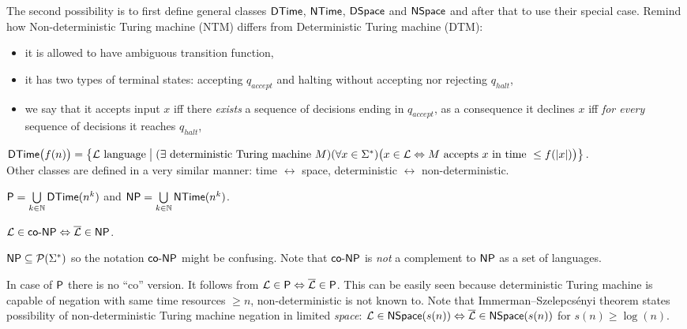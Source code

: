 		The second possibility is to first define general classes $\DTime$, $\NTime$, $\DSpace$ and $\NSpace$ and after that to use their special case. Remind how Non-deterministic Turing machine (NTM) differs from Deterministic Turing machine (DTM):
		\begin{itemize}
			\item it is allowed to have ambiguous transition function,
			\item it has two types of terminal states: accepting $q_{accept}$ and halting without accepting nor rejecting $q_{halt}$,
			\item we say that it accepts input $x$ iff there {\em exists} a sequence of decisions ending in $q_{accept}$, as a consequence it declines $x$ iff {\em for every} sequence of decisions it reaches $q_{halt}$,
		\end{itemize}
		
		\begin{defn}\label{def:DTime}
			$\DTime\bigl(f(n)\bigr) = \bigl\{ {\cal L}\textnormal{ language} \bigm| (\exists \textnormal{ deterministic Turing machine }M)\\ (\forall x\in\Sigma^*)\bigl(x\in{\cal L} \iff M\textnormal{ accepts }x\textnormal{ in time }\leq f(|x|)\bigr) \bigr\}$.\\
			Other classes are defined in a very similar manner: time $\leftrightarrow$ space, deterministic $\leftrightarrow$ non-deterministic.
		\end{defn}
		
		\begin{defn}
			$\P = \bigcup\limits_{k\in\N} \DTime(n^k)$ and $\NP = \bigcup\limits_{k\in\N} \NTime(n^k)$.
		\end{defn}
		
		\begin{defn}
			$ {\cal L} \in \coNP \iff {\cal\overline L} \in \NP $.
		\end{defn}
		
		\begin{note}
			$\NP\subseteq\powerset{\Sigma^*}$ so the notation $\coNP$ might be confusing. Note that $\coNP$ is {\em not} a complement to $\NP$ as a set of languages.
		\end{note}
		
		\begin{remark}
			In case of $\P$ there is no ``co'' version. It follows from ${\cal L} \in \P \iff \overline{\cal L} \in \P$. This can be easily seen because deterministic Turing machine is capable of negation with same time resources $\geq n$, non-deterministic is not known to. Note that Immerman--Szelepcsényi theorem states possibility of non-deterministic Turing machine negation in limited {\em space}: ${\cal L} \in \NSpace(s(n)) \iff \overline{\cal L} \in \NSpace(s(n))$ for $s(n) \geq \log(n)$.
		\end{remark}
		
